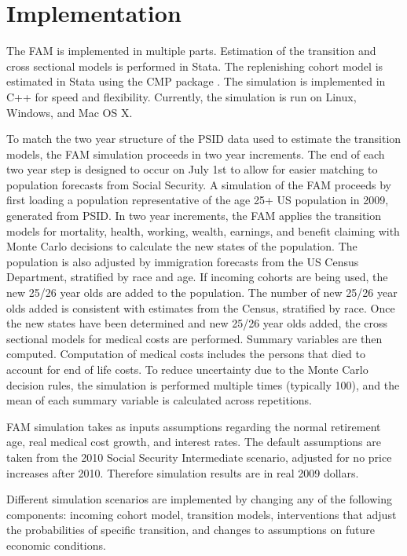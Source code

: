 \section{Implementation}
The FAM is implemented in multiple parts. Estimation of the transition and cross 
sectional models is performed in Stata.
The replenishing cohort model is estimated in Stata using the CMP package \citep{statacmp2011}.
The simulation is implemented in C++ for speed and flexibility.  Currently, the simulation is
run on Linux, Windows, and Mac OS X.  

To match the two year structure of the PSID data used to estimate the 
transition models, the FAM simulation proceeds in two year increments. The end 
of each two year step is designed to occur on July 1st to allow for easier 
matching to population forecasts from Social Security. A simulation of the FAM 
proceeds by first loading a population representative of the age 25+ US 
population in 2009, generated from PSID. In two year increments, the FAM applies 
the transition models for mortality, health, working, wealth, earnings, and 
benefit claiming with Monte Carlo decisions to calculate the new states of the 
population. The population is also adjusted by immigration forecasts from the 
US Census Department, stratified by race and age. If incoming cohorts are being 
used, the new 25/26 year olds are added to the population. The number of new 
25/26 year olds added is consistent with estimates from the Census, stratified 
by race. Once the new states have been determined and new 25/26 year olds added, 
the cross sectional models for medical costs are performed. Summary variables 
are then computed. Computation of medical costs includes the persons that died 
to account for end of life costs. To reduce uncertainty due to the Monte 
Carlo decision rules, the simulation is performed multiple times (typically 
100), and the mean of each summary variable is calculated across repetitions. 

FAM simulation takes as inputs assumptions regarding  
the normal retirement age, real medical cost growth, and interest rates. The 
default assumptions are taken from the 2010 Social Security Intermediate 
scenario, adjusted for no price increases after 2010. Therefore simulation 
results are in real 2009 dollars.  

Different simulation scenarios are implemented by changing any of the following 
components: incoming cohort model, transition models, interventions that adjust 
the probabilities of specific transition, and changes to assumptions on future 
economic conditions.  	



